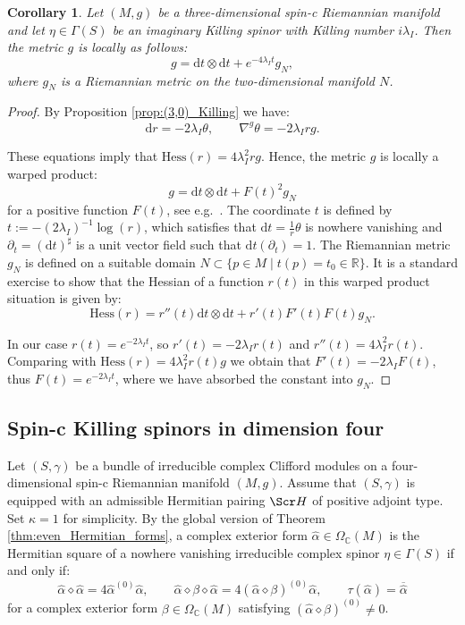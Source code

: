 \documentclass[10pt,a4paper,twoside,reqno]{amsart}
\theoremstyle{plain}
\newtheorem{cor}[thm]{Corollary}
\theoremstyle{definition}
\theoremstyle{remark}
\def\C{\mathbb{C}}
\def\R{\mathbb{R}}
\def\dd{\mathrm{d}}
\def\scS{\Scr H}
\def\R{\mathbb{R}}
\def\dd{\mathrm{d}}
\def\Hess{\mathrm{Hess}}
\begin{document}
\begin{cor}
    Let $(M,g)$ be a three-dimensional spin-c Riemannian manifold and let $\eta\in\Gamma(S)$ be an imaginary Killing spinor with Killing number $i\lambda_I$. Then the metric $g$ is locally as follows: $$g=\dd t\otimes\dd t+e^{-4\lambda_It}g_N,$$ where $g_N$ is a Riemannian metric on the two-dimensional manifold $N$.
\end{cor}

\begin{proof}
    By Proposition \ref{prop:(3,0)_Killing} we have: $$\dd r=-2\lambda_I\theta,\qquad \nabla^g\theta=-2\lambda_Irg.$$

    These equations imply that $\Hess(r)=4\lambda_I^2rg$. Hence, the metric $g$ is locally a warped product: $$g=\dd t\otimes\dd t+F(t)^2g_N$$ for a positive function $F(t)$, see e.g.\ \cite[Thm.\ 4.3.3]{Petersen2016}. The coordinate $t$ is defined by $t:=-(2\lambda_I)^{-1}\log(r)$, which satisfies that $\dd t=\frac{1}{r}\theta$ is nowhere vanishing and $\partial_t=(\dd t)^\sharp$ is a unit vector field such that $\dd t(\partial_t)=1$. The Riemannian metric $g_N$ is defined on a suitable domain $N\subset\{p\in M\mid t(p)=t_0\in\R\}$. It is a standard exercise to show that the Hessian of a function $r(t)$ in this warped product situation is given by: \begin{equation}\label{eq:Hessian_warped_product}
        \Hess(r)=r''(t)\dd t\otimes\dd t+r'(t)F'(t)F(t)g_N.
    \end{equation}
    
    In our case $r(t)=e^{-2\lambda_It}$, so $r'(t)=-2\lambda_Ir(t)$ and $r''(t)=4\lambda_I^2r(t)$. Comparing with $\Hess(r)=4\lambda_I^2r(t)g$ we obtain that $F'(t)=-2\lambda_IF(t)$, thus $F(t)=e^{-2\lambda_It}$, where we have absorbed the constant into $g_N$.
\end{proof}


\subsection{Spin-c Killing spinors in dimension four}


Let $(S,\gamma)$ be a bundle of irreducible complex Clifford modules on a four-dimensional spin-c Riemannian manifold $(M,g)$. Assume that $(S,\gamma)$ is equipped with an admissible Hermitian pairing $\scS$ of positive adjoint type. Set $\kappa=1$ for simplicity. By the global version of Theorem \ref{thm:even_Hermitian_forms}, a complex exterior form $\widehat{\alpha}\in\Omega_\C(M)$ is the Hermitian square of a nowhere vanishing irreducible complex spinor $\eta\in\Gamma(S)$ if and only if: $$\widehat{\alpha}\diamond\widehat{\alpha}=4\widehat{\alpha}^{(0)}\widehat{\alpha},\qquad \widehat{\alpha}\diamond\beta\diamond\widehat{\alpha}=4(\widehat{\alpha}\diamond\beta)^{(0)}\widehat{\alpha},\qquad \tau(\widehat{\alpha})=\overline{\widehat{\alpha}}$$ for a complex exterior form $\beta\in\Omega_\C(M)$ satisfying $(\widehat{\alpha}\diamond\beta)^{(0)}\neq0$.
\end{document}
